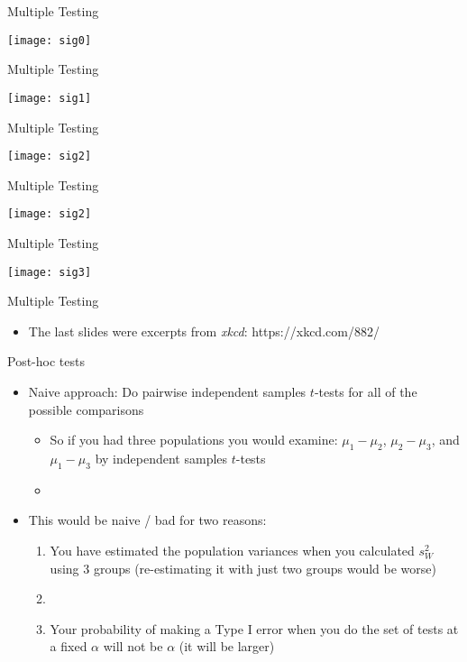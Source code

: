 \documentclass[xcolor=dvipsnames]{beamer}
\begin{document}
\begin{frame}{Multiple Testing}
\begin{center}
	\texttt{[image: sig0]}
\end{center}
\end{frame}

\begin{frame}{Multiple Testing}
	\begin{center}
		\texttt{[image: sig1]}
	\end{center}
\end{frame}

\begin{frame}{Multiple Testing}
\begin{center}
	\texttt{[image: sig2]}
\end{center}
\end{frame}

\begin{frame}{Multiple Testing}
\begin{center}
	\texttt{[image: sig2]}
\end{center}
\end{frame}

\begin{frame}{Multiple Testing}
\begin{center}
	\texttt{[image: sig3]}
\end{center}
\end{frame}

\begin{frame}{Multiple Testing}
\begin{itemize}
	\item The last slides were excerpts from \emph{xkcd}: https://xkcd.com/882/
\end{itemize}
\end{frame}

\begin{frame}{Post-hoc tests}
\begin{itemize}
	\item Naive approach: Do pairwise independent samples $t$-tests for all of the possible comparisons \pause
	\begin{itemize}
		\item So if you had three populations you would examine: $\mu_1-\mu_2$, $\mu_2-\mu_3$, and $\mu_1-\mu_3$ by independent samples $t$-tests \pause
		\item[]
	\end{itemize}
	\item This would be naive / bad for two reasons: \pause
	\begin{enumerate}
		\item You have estimated the population variances when you calculated $s^2_W$ using 3 groups (re-estimating it with just two groups would be worse) \pause
		\item[]
		\item Your probability of making a Type I error when you do the set of tests at a fixed $\alpha$ will not be $\alpha$ (it will be larger)
	\end{enumerate}
\end{itemize}
\end{frame}
\end{document}
